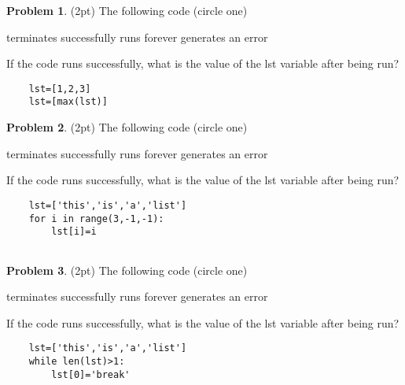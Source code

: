 \documentclass[10pt]{article}
\theoremstyle{definition}
\newtheorem{problem}{Problem}
\begin{document}
\begin{problem}
    (2pt)
    The following code (circle one)
    
    \vspace{0.25in}
    \hspace{0.5in}terminates successfully
    \hspace{1in}runs forever
    \hspace{1in}generates an error
    \vspace{0.25in}

    \noindent
    If the code runs successfully, what is the value of the lst variable after being run?
\end{problem}
\begin{lstlisting}
    lst=[1,2,3]
    lst=[max(lst)]
\end{lstlisting}
\vspace{2in}
\newpage
\begin{problem}
    (2pt)
    The following code (circle one)
    
    \vspace{0.25in}
    \hspace{0.5in}terminates successfully
    \hspace{1in}runs forever
    \hspace{1in}generates an error
    \vspace{0.25in}

    \noindent
    If the code runs successfully, what is the value of the lst variable after being run?
\end{problem}
\begin{lstlisting}
    lst=['this','is','a','list']
    for i in range(3,-1,-1):
        lst[i]=i
        
\end{lstlisting}
\vspace{3.5in}

\begin{problem}
    (2pt)
    The following code (circle one)
    
    \vspace{0.25in}
    \hspace{0.5in}terminates successfully
    \hspace{1in}runs forever
    \hspace{1in}generates an error
    \vspace{0.25in}

    \noindent
    If the code runs successfully, what is the value of the lst variable after being run?
\end{problem}
\begin{lstlisting}
    lst=['this','is','a','list']
    while len(lst)>1:
        lst[0]='break'
\end{lstlisting}
\vspace{1.5in}
\end{document}
